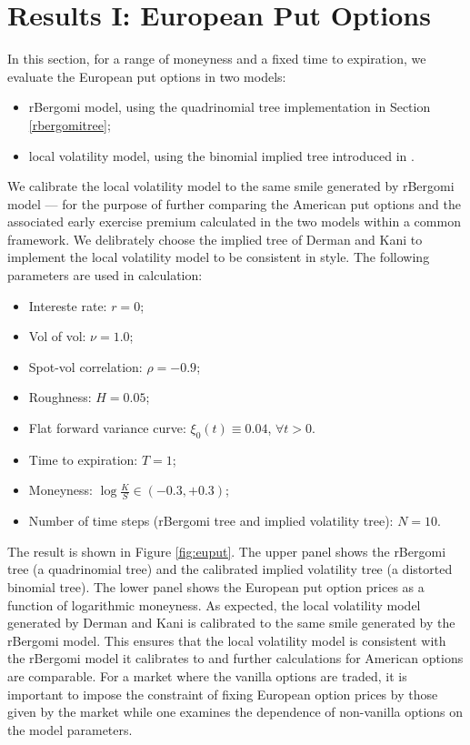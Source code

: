 \documentclass[12pt]{article}
\numberwithin{equation}{section}
\begin{document}
\section{Results I: European Put Options}
\label{euputoptions}
In this section, for a range of moneyness and a fixed time to expiration, we evaluate the European put options in two models:
\begin{itemize}[noitemsep]
\item rBergomi model, using the quadrinomial tree implementation in Section \ref{rbergomitree};
\item local volatility model, using the binomial implied tree introduced in \cite{derman}.
\end{itemize}
We calibrate the local volatility model to the same smile generated by rBergomi model --- for the purpose of further comparing the American put options and the associated early exercise premium calculated in the two models within a common framework. We delibrately choose the implied tree of Derman and Kani \cite{derman} to implement the local volatility model to be consistent in style. The following parameters are used in calculation:
\begin{itemize}[noitemsep]
\item Intereste rate: $r=0$;
\item Vol of vol: $\nu = 1.0$;
\item Spot-vol correlation: $\rho = -0.9$;
\item Roughness: $H = 0.05$;
\item Flat forward variance curve: $\xi_0(t)\equiv 0.04$, $\forall t>0$.
\item Time to expiration: $T=1$;
\item Moneyness: $\log\frac{K}{S} \in (-0.3, + 0.3)$;
\item Number of time steps (rBergomi tree and implied volatility tree): $N=10$.
\end{itemize}
The result is shown in Figure \ref{fig:euput}. The upper panel shows the rBergomi tree (a quadrinomial tree) and the calibrated implied volatility tree (a distorted binomial tree). The lower panel shows the European put option prices as a function of logarithmic moneyness. As expected, the local volatility model generated by Derman and Kani \cite{derman} is calibrated to the same smile generated by the rBergomi model. This ensures that the local volatility model is consistent with the rBergomi model it calibrates to and further calculations for American options are comparable. For a market where the vanilla options are traded, it is important to impose the constraint of fixing European option prices by those given by the market while one examines the dependence of non-vanilla options on the model parameters. 
\end{document}
